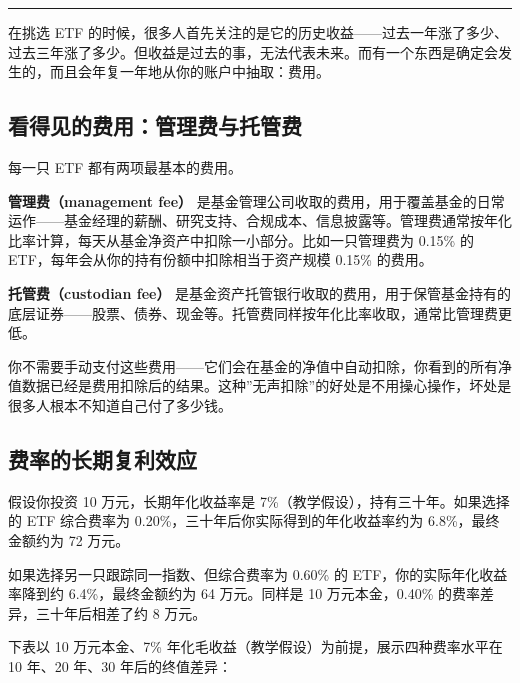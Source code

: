 \documentclass[a4paper,11pt,oneside,fontset=none,UTF8,zihao=-4]{ctexbook}
\begin{document}
\begin{center}{\color{dh-bronze}\rule{0.2\textwidth}{0.5pt}}\end{center}

在挑选 ETF
的时候，很多人首先关注的是它的历史收益------过去一年涨了多少、过去三年涨了多少。但收益是过去的事，无法代表未来。而有一个东西是确定会发生的，而且会年复一年地从你的账户中抽取：费用。

\subsection{看得见的费用：管理费与托管费}\label{ux770bux5f97ux89c1ux7684ux8d39ux7528ux7ba1ux7406ux8d39ux4e0eux6258ux7ba1ux8d39}

每一只 ETF 都有两项最基本的费用。

\textbf{管理费（management fee）}
是基金管理公司收取的费用，用于覆盖基金的日常运作------基金经理的薪酬、研究支持、合规成本、信息披露等。管理费通常按年化比率计算，每天从基金净资产中扣除一小部分。比如一只管理费为
0.15\% 的 ETF，每年会从你的持有份额中扣除相当于资产规模 0.15\% 的费用。

\textbf{托管费（custodian fee）}
是基金资产托管银行收取的费用，用于保管基金持有的底层证券------股票、债券、现金等。托管费同样按年化比率收取，通常比管理费更低。

你不需要手动支付这些费用------它们会在基金的净值中自动扣除，你看到的所有净值数据已经是费用扣除后的结果。这种''无声扣除''的好处是不用操心操作，坏处是很多人根本不知道自己付了多少钱。

\subsection{费率的长期复利效应}\label{ux8d39ux7387ux7684ux957fux671fux590dux5229ux6548ux5e94}

假设你投资 10 万元，长期年化收益率是
7\%（教学假设），持有三十年。如果选择的 ETF 综合费率为
0.20\%，三十年后你实际得到的年化收益率约为 6.8\%，最终金额约为 72 万元。

如果选择另一只跟踪同一指数、但综合费率为 0.60\% 的
ETF，你的实际年化收益率降到约 6.4\%，最终金额约为 64 万元。同样是 10
万元本金，0.40\% 的费率差异，三十年后相差了约 8 万元。

下表以 10 万元本金、7\% 年化毛收益（教学假设）为前提，展示四种费率水平在
10 年、20 年、30 年后的终值差异：
\end{document}
